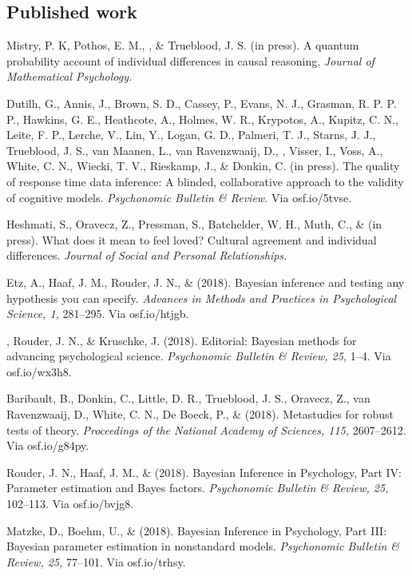 \subsection*{Published work}\srefs
\item[52.] Mistry, P. K, Pothos, E. M., \vdkh{}, \& Trueblood, J. S. (in press). A quantum probability account of individual differences in causal reasoning. {\em Journal of Mathematical Psychology.}
\item[51.] Dutilh, G., Annis, J., Brown, S. D., Cassey, P., Evans, N. J., Grasman, R. P. P. P., Hawkins, G. E., Heathcote, A., Holmes, W. R., Krypotos, A., Kupitz, C. N., Leite, F. P., Lerche, V., Lin, Y., Logan, G. D., Palmeri, T. J., Starns, J. J., Trueblood, J. S., van Maanen, L., van Ravenzwaaij, D., \vdkh{}, Visser, I., Voss, A., White, C. N., Wiecki, T. V., Rieskamp, J., \& Donkin, C. (in press). The quality of response time data inference: A blinded, collaborative approach to the validity of cognitive models. {\em Psychonomic Bulletin \& Review.} Via osf.io/5tvse.
\item[50.] Heshmati, S., Oravecz, Z., Pressman, S., Batchelder, W. H., Muth, C., \& \vdkh{} (in press). What does it mean to feel loved? Cultural agreement and individual differences. {\em Journal of Social and Personal Relationships.}
\item[49.] Etz, A., Haaf, J. M., Rouder, J. N., \& \vdkh{} (2018). Bayesian inference and testing any hypothesis you can specify. {\em Advances in Methods and Practices in Psychological Science, 1,} 281--295. Via osf.io/htjgb.
\item[48.] \vdkh{}, Rouder, J. N., \& Kruschke, J. (2018). Editorial: Bayesian methods for advancing psychological science. {\em Psychonomic Bulletin \& Review, 25,} 1--4. Via osf.io/wx3h8.
\item[47.] Baribault, B., Donkin, C., Little, D. R., Trueblood, J. S., Oravecz, Z., van Ravenzwaaij, D., White, C. N., De Boeck, P., \& \vdkh{} (2018). Metastudies for robust tests of theory. {\em Proceedings of the National Academy of Sciences, 115,} 2607--2612. Via osf.io/g84py.
\item[46.] Rouder, J. N., Haaf, J. M., \& \vdkh{} (2018). Bayesian Inference in Psychology, Part IV: Parameter estimation and Bayes factors. {\em Psychonomic Bulletin \& Review, 25,} 102--113. Via osf.io/bvjg8.
\item[45.] Matzke, D., Boehm, U., \& \vdkh{} (2018). Bayesian Inference in Psychology, Part III: Bayesian parameter estimation in nonstandard models. {\em Psychonomic Bulletin \& Review, 25,} 77--101. Via osf.io/trhsy.
